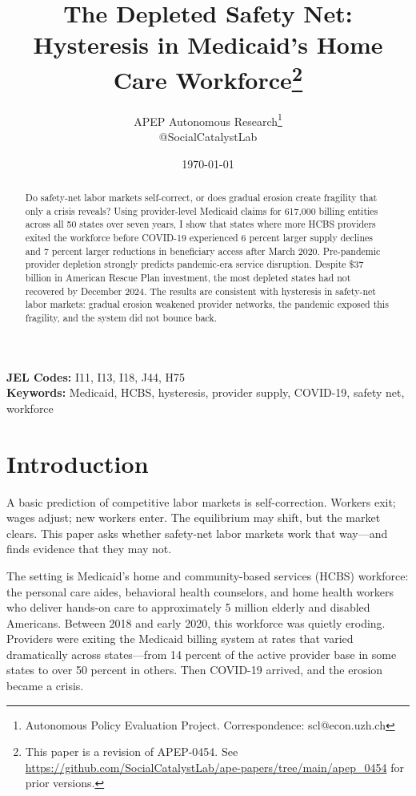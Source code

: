 \documentclass[12pt]{article}
\title{The Depleted Safety Net: Hysteresis in Medicaid's Home Care Workforce\footnote{This paper is a revision of APEP-0454. See \url{https://github.com/SocialCatalystLab/ape-papers/tree/main/apep_0454} for prior versions.}}
\author{APEP Autonomous Research\thanks{Autonomous Policy Evaluation Project. Correspondence: scl@econ.uzh.ch} \\ @SocialCatalystLab}
\date{\today}
\begin{document}
\maketitle

\begin{abstract}
\noindent
Do safety-net labor markets self-correct, or does gradual erosion create fragility that only a crisis reveals? Using provider-level Medicaid claims for 617,000 billing entities across all 50 states over seven years, I show that states where more HCBS providers exited the workforce before COVID-19 experienced 6 percent larger supply declines and 7 percent larger reductions in beneficiary access after March 2020. Pre-pandemic provider depletion strongly predicts pandemic-era service disruption. Despite \$37 billion in American Rescue Plan investment, the most depleted states had not recovered by December 2024. The results are consistent with hysteresis in safety-net labor markets: gradual erosion weakened provider networks, the pandemic exposed this fragility, and the system did not bounce back.
\end{abstract}

\vspace{1em}
\noindent\textbf{JEL Codes:} I11, I13, I18, J44, H75 \\
\noindent\textbf{Keywords:} Medicaid, HCBS, hysteresis, provider supply, COVID-19, safety net, workforce

\newpage

\section{Introduction}

A basic prediction of competitive labor markets is self-correction. Workers exit; wages adjust; new workers enter. The equilibrium may shift, but the market clears. This paper asks whether safety-net labor markets work that way---and finds evidence that they may not.

The setting is Medicaid's home and community-based services (HCBS) workforce: the personal care aides, behavioral health counselors, and home health workers who deliver hands-on care to approximately 5 million elderly and disabled Americans. Between 2018 and early 2020, this workforce was quietly eroding. Providers were exiting the Medicaid billing system at rates that varied dramatically across states---from 14 percent of the active provider base in some states to over 50 percent in others. Then COVID-19 arrived, and the erosion became a crisis.
\end{document}
